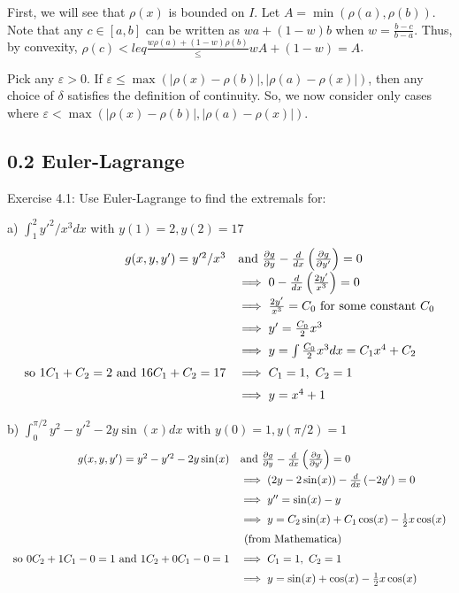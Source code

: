 \documentclass[11pt]{article}
\begin{document}
First, we will see that $\rho(x)$ is bounded on $I$.
Let $A=\min(\rho(a),\rho(b))$.
Note that any $c\in[a,b]$ can be written as
$wa+(1-w)b$ when $w=\frac{b-c}{b-a}$. Thus, by convexity,
$\rho(c)<leq\frac{w\rho(a)+(1-w)\rho(b)}\leq wA+(1-w)=A$.

Pick any $\varepsilon>0$. If
$\varepsilon\leq\max(|\rho(x)-\rho(b)|,|\rho(a)-\rho(x)|)$, then any
choice of $\delta$ satisfies the definition of continuity. So, we now
consider only cases where
$\varepsilon<\max(|\rho(x)-\rho(b)|,|\rho(a)-\rho(x)|)$.

\subsection*{0.2 Euler-Lagrange}

Exercise 4.1: Use Euler-Lagrange to find the extremals for:

a) $\int_1^2y'^2/x^3dx$ with $y(1)=2,y(2)=17$
\[
\def\arraystretch{1.5}
\begin{array}{rl}
    g(x,y,y')=y'^2/x^3 &\textrm{and}\ 
    \frac{\partial g}{\partial y}-\frac{d}{dx}\left(\frac{\partial g}{\partial y'}\right)=0 \\
    &\implies 0-\frac{d}{dx}\left(\frac{2y'}{x^3}\right)=0 \\
    &\implies \frac{2y'}{x^3}=C_0\textrm{ for some constant $C_0$} \\
    &\implies y'=\frac{C_0}{2}x^3 \\
    &\implies y=\int\frac{C_0}{2}x^3dx=C_1x^4+C_2 \\
    \textrm{so }1C_1+C_2=2\textrm{ and }16C_1+C_2=17 &\implies
    C_1=1,\ C_2=1 \\
    &\implies y=x^4+1
\end{array}
\]

b) $\int_0^{\pi/2}y^2-y'^2-2y\sin(x) dx$ with $y(0)=1,y(\pi/2)=1$
\[
\def\arraystretch{1.5}
\begin{array}{rl}
    g(x,y,y')=y^2-y'^2-2y\sin(x) &\textrm{and}\ 
    \frac{\partial g}{\partial y}-\frac{d}{dx}\left(\frac{\partial g}{\partial y'}\right)=0 \\
    &\implies (2y-2\sin(x))-\frac{d}{dx}\left(-2y'\right)=0 \\
    &\implies y''=\sin(x)-y \\
    &\implies y=C_2\sin(x)+C_1\cos(x)-\frac{1}{2}x\cos(x) \\
    &\textrm{ (from Mathematica) } \\
    \textrm{so }0C_2+1C_1-0=1\textrm{ and }1C_2+0C_1-0=1 &\implies
    C_1=1,\ C_2=1 \\
    &\implies y=\sin(x)+\cos(x)-\frac{1}{2}x\cos(x)
\end{array}
\]
\end{document}
